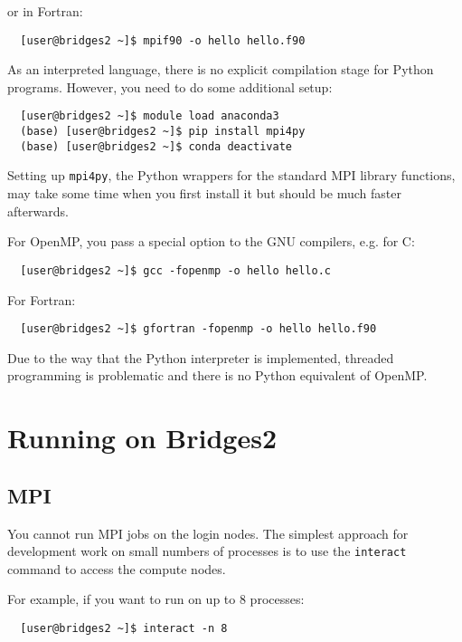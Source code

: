 \documentclass{article}
\begin{document}
or in Fortran:

\begin{verbatim}
  [user@bridges2 ~]$ mpif90 -o hello hello.f90
\end{verbatim}

As an interpreted language, there is no explicit compilation stage for
Python programs. However, you need to do some additional setup:

\begin{verbatim}
  [user@bridges2 ~]$ module load anaconda3
  (base) [user@bridges2 ~]$ pip install mpi4py
  (base) [user@bridges2 ~]$ conda deactivate
\end{verbatim}

Setting up \texttt{mpi4py}, the Python wrappers for the standard MPI
library functions, may take some time when you first install it but
should be much faster afterwards.

For OpenMP, you pass a special option to the GNU compilers, e.g. for C:

\begin{verbatim}
  [user@bridges2 ~]$ gcc -fopenmp -o hello hello.c
\end{verbatim}

For Fortran:

\begin{verbatim}
  [user@bridges2 ~]$ gfortran -fopenmp -o hello hello.f90
\end{verbatim}

Due to the way that the Python interpreter is implemented, threaded
programming is problematic and there is no Python equivalent of OpenMP.

\section{{\label{sec:running}}Running on Bridges2}

\subsection{MPI}

You cannot run MPI jobs on the login nodes. The simplest approach for
development work on small numbers of processes is to use the
\verb+interact+ command to access the compute nodes.

For example, if you want to run on up to 8 processes:

\begin{verbatim}
  [user@bridges2 ~]$ interact -n 8
\end{verbatim}
    
\end{document}
